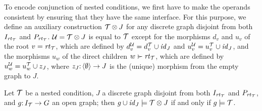 To encode conjunction of nested conditions, we first have to make the operands consistent by ensuring that they have the same interface. For this purpose, we define an auxiliary construction ${\mathcal{T}}\otimes J$ for any discrete graph disjoint from both $I_{\mathit{rt}_{{\mathcal{T}}}}$ and $P_{\mathit{rt}_{{\mathcal{T}}}}$. ${\mathcal{U}}={\mathcal{T}}\otimes J$ is equal to ${\mathcal{T}}$ except for the morphisms $d_v$ and $u_v$ of the root $v=\mathit{rt}_{{\mathcal{T}}}$, which are defined by $d^{\mathcal{U}}_v=d^{\mathcal{T}}_v\cup {\mathit{id}}_J$ and $u^{\mathcal{U}}_v=u^{\mathcal{T}}_v\cup {\mathit{id}}_J$, and the morphisms $u_w$ of the direct children $w\childof\rt\cT$, which are defined by $u^{\mathcal{U}}_w=u^{\mathcal{T}}_w\cup z_J$, where $z_J{:}\, \langle \emptyset\rangle\rightarrow J$ is the (unique) morphism from the empty graph to $J$.

\begin{proposition}
Let ${\mathcal{T}}$ be a nested condition, $J$ a discrete graph disjoint from both $I_{\mathit{rt}_{{\mathcal{T}}}}$ and $P_{\mathit{rt}_{{\mathcal{T}}}}$, and $g{:}\, I_{\mathcal{T}}\rightarrow G$ an open graph; then $g\cup {\mathit{id}}_J\models {\mathcal{T}}\otimes J$ if and only if $g\models{\mathcal{T}}$.
\end{proposition}
